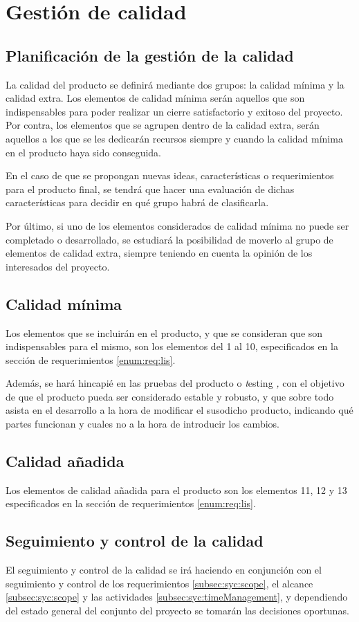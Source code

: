 \section{Gestión de calidad}
\label{sec:qua:manag}
\subsection{Planificación de la gestión de la calidad}
La calidad del producto se definirá mediante dos grupos: la calidad
mínima y la calidad extra. Los elementos de calidad mínima serán
aquellos que son indispensables para poder realizar un cierre
satisfactorio y exitoso del proyecto. Por contra, los elementos que se
agrupen dentro de la calidad extra, serán aquellos a los que se les
dedicarán recursos siempre y cuando la calidad mínima en el producto
haya sido conseguida.

En el caso de que se propongan nuevas ideas, características o
requerimientos para el producto final, se tendrá que hacer una
evaluación de dichas características para decidir en qué grupo habrá de
clasificarla.

Por último, si uno de los elementos considerados de calidad mínima no
puede ser completado o desarrollado, se estudiará la posibilidad de
moverlo al grupo de elementos de calidad extra, siempre teniendo en
cuenta la opinión de los interesados del proyecto.

\subsection{Calidad mínima}
\label{sec:min:qual}
Los elementos que se incluirán en el producto, y que se consideran que
son indispensables para el mismo, son los elementos del 1 al 10, especificados 
en la sección de requerimientos \ref{enum:req:lis}.

Además, se hará hincapié en las pruebas del producto o \textit testing \textit,
con el objetivo de que el producto pueda ser considerado estable y robusto, y
que sobre todo asista en el desarrollo a la hora de modificar el susodicho
producto, indicando qué partes funcionan y cuales no a la hora de introducir
los cambios.

\subsection{Calidad añadida}
\label{sec:add:qual}
Los elementos de calidad añadida para el producto son los elementos 11,
12 y 13 especificados en la sección de requerimientos \ref{enum:req:lis}.

\subsection{Seguimiento y control de la calidad}
El seguimiento y control de la calidad se irá haciendo en conjunción con
el seguimiento y control de los requerimientos \ref{subsec:syc:scope},
el alcance \ref{subsec:syc:scope} y las actividades
\ref{subsec:syc:timeManagement}, y dependiendo del estado general del
conjunto del proyecto se tomarán las decisiones oportunas.
